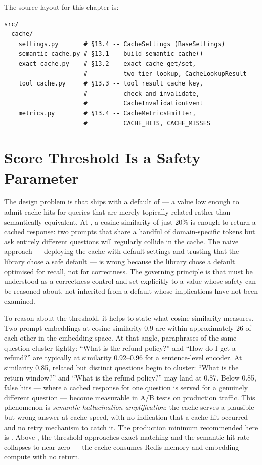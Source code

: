 The source layout for this chapter is:

\begin{verbatim}
src/
  cache/
    settings.py       # §13.4 -- CacheSettings (BaseSettings)
    semantic_cache.py # §13.1 -- build_semantic_cache()
    exact_cache.py    # §13.2 -- exact_cache_get/set,
                      #          two_tier_lookup, CacheLookupResult
    tool_cache.py     # §13.3 -- tool_result_cache_key,
                      #          check_and_invalidate,
                      #          CacheInvalidationEvent
    metrics.py        # §13.4 -- CacheMetricsEmitter,
                      #          CACHE_HITS, CACHE_MISSES
\end{verbatim}


\section{Score Threshold Is a Safety Parameter}
\label{sec:cache-threshold}

The design problem is that  ships with a
 default of  --- a value low enough to
admit cache hits for queries that are merely topically related rather
than semantically equivalent. At , a cosine similarity of just
20\% is enough to return a cached response: two prompts that share a
handful of domain-specific tokens but ask entirely different questions
will regularly collide in the cache. The naive approach --- deploying the
cache with default settings and trusting that the library chose a safe
default --- is wrong because the library chose a default optimised for
recall, not for correctness. The governing principle is that
 must be understood as a correctness control and
set explicitly to a value whose safety can be reasoned about, not
inherited from a default whose implications have not been examined.

To reason about the threshold, it helps to state what cosine similarity
measures. Two prompt embeddings at cosine similarity 0.9 are within
approximately 26\textdegree{} of each other in the embedding space. At
that angle, paraphrases of the same question cluster tightly: ``What is
the refund policy?'' and ``How do I get a refund?'' are typically at
similarity 0.92--0.96 for a sentence-level encoder. At similarity 0.85,
related but distinct questions begin to cluster: ``What is the return
window?'' and ``What is the refund policy?'' may land at 0.87. Below
0.85, false hits --- where a cached response for one question is served
for a genuinely different question --- become measurable in A/B tests on
production traffic. This phenomenon is \emph{semantic hallucination
amplification}: the cache serves a plausible but wrong answer at cache
speed, with no indication that a cache hit occurred and no retry
mechanism to catch it. The production minimum recommended here is
. Above , the threshold approaches
exact matching and the semantic hit rate collapses to near zero --- the
cache consumes Redis memory and embedding compute with no return.

